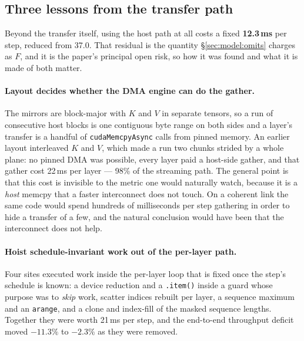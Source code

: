 \subsection{Three lessons from the transfer path}
\label{sec:impl:cost}

Beyond the transfer itself, using the host path at all costs a fixed
\textbf{12.3\,ms} per step, reduced from 37.0. That residual is the quantity
\S\ref{sec:model:omits} charges as $F$, and it is the paper's principal open
risk, so how it was found and what it is made of both matter.

\paragraph{Layout decides whether the DMA engine can do the gather.} The mirrors
are block-major with $K$ and $V$ in separate tensors, so a run of consecutive
host blocks is one contiguous byte range on both sides and a layer's transfer is
a handful of \texttt{cudaMemcpyAsync} calls from pinned memory. An earlier layout
interleaved $K$ and $V$, which made a run two chunks strided by a whole plane:
no pinned DMA was possible, every layer paid a host-side gather, and that gather
cost 22\,ms per layer --- 98\% of the streaming path. The general point is that
this cost is invisible to the metric one would naturally watch, because it is a
\emph{host} memcpy that a faster interconnect does not touch. On a coherent link
the same code would spend hundreds of milliseconds per step gathering in order to
hide a transfer of a few, and the natural conclusion would have been that the
interconnect does not help.

\paragraph{Hoist schedule-invariant work out of the per-layer path.} Four sites
executed work inside the per-layer loop that is fixed once the step's schedule is
known: a device reduction and a \texttt{.item()} inside a guard whose purpose was
to \emph{skip} work, scatter indices rebuilt per layer, a sequence maximum and an
\texttt{arange}, and a clone and index-fill of the masked sequence lengths.
Together they were worth 21\,ms per step, and the end-to-end throughput deficit
moved $-11.3\%$ to $-2.3\%$ as they were removed.

